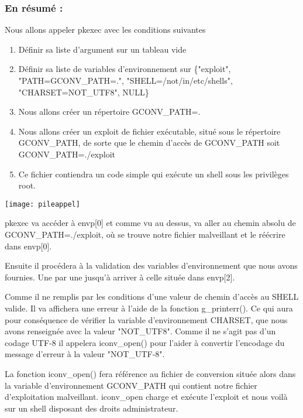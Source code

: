 \documentclass[12pt,a4paper]{article}
\begin{document}
\begin{flushleft}
            \subsubsection{En résumé : }
            \item Nous allons appeler pkexec avec les conditions suivantes
            \begin{enumerate}
                \item Définir sa liste d'argument sur un tableau vide
                \item Définir sa liste de variables d'environnement sur \{"exploit", "PATH=GCONV\_PATH=.", "SHELL=/not/in/etc/shells", "CHARSET=NOT\_UTF8", NULL\}
                \item Nous allons créer un répertoire GCONV\_PATH=.
                \item Nous allons créer un exploit de fichier exécutable, situé sous le répertoire GCONV\_PATH, de sorte que le chemin d'accès de GCONV\_PATH soit GCONV\_PATH=./exploit
                \item Ce fichier contiendra un code simple qui exécute un shell sous les privilèges root.
            \end{enumerate}
            \begin{center}
                    \texttt{[image: pileappel]} 
            \end{center}
            \item pkexec va accéder à envp[0] et comme vu au dessus, va aller au chemin absolu de GCONV\_PATH=./exploit, où se trouve notre fichier malveillant et le réécrire dans envp[0].
            \item Ensuite il procédera à la validation des variables d'environnement que nous avons fournies. Une par une jusqu'à arriver à celle située dans envp[2].
            \item Comme il ne remplis par les conditions d'une valeur de chemin d'accès au SHELL valide. Il va affichera une erreur à l'aide de la fonction g\_printerr(). Ce qui aura pour conséquence de vérifier la variable d'environnement CHARSET, que nous avons renseignée avec la valeur "NOT\_UTF8". Comme il ne s'agit pas d'un codage UTF-8 il appelera iconv\_open() pour l'aider à convertir l'encodage du message d'erreur à la valeur "NOT\_UTF-8".
            \item La fonction iconv\_open() fera référence au fichier de conversion située alors dans la variable d'environnement GCONV\_PATH qui contient notre fichier d'exploitation malveillant. iconv\_open charge et exécute l'exploit et nous voilà sur un shell disposant des droits administrateur.

    \end{flushleft}
       \newpage
\end{document}
